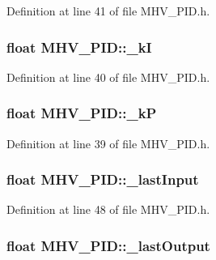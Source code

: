 \-Definition at line 41 of file \-M\-H\-V\-\_\-\-P\-I\-D.\-h.

\hypertarget{class_m_h_v___p_i_d_a47e47fe3d120325d9b12e205a274dcaa}{
\subsubsection[{\-\_\-k\-I}]{\setlength{\rightskip}{0pt plus 5cm}float {\bf \-M\-H\-V\-\_\-\-P\-I\-D\-::\-\_\-k\-I}}}
\label{class_m_h_v___p_i_d_a47e47fe3d120325d9b12e205a274dcaa}


\-Definition at line 40 of file \-M\-H\-V\-\_\-\-P\-I\-D.\-h.

\hypertarget{class_m_h_v___p_i_d_a2987b7582914a11ec39c38c2c2f8bb4f}{
\subsubsection[{\-\_\-k\-P}]{\setlength{\rightskip}{0pt plus 5cm}float {\bf \-M\-H\-V\-\_\-\-P\-I\-D\-::\-\_\-k\-P}}}
\label{class_m_h_v___p_i_d_a2987b7582914a11ec39c38c2c2f8bb4f}


\-Definition at line 39 of file \-M\-H\-V\-\_\-\-P\-I\-D.\-h.

\hypertarget{class_m_h_v___p_i_d_aa649c3528fb35b99ac6ce0dca338fcfb}{
\subsubsection[{\-\_\-last\-Input}]{\setlength{\rightskip}{0pt plus 5cm}float {\bf \-M\-H\-V\-\_\-\-P\-I\-D\-::\-\_\-last\-Input}}}
\label{class_m_h_v___p_i_d_aa649c3528fb35b99ac6ce0dca338fcfb}


\-Definition at line 48 of file \-M\-H\-V\-\_\-\-P\-I\-D.\-h.

\hypertarget{class_m_h_v___p_i_d_a8464b83c97658e1f78a0c927476af6de}{
\subsubsection[{\-\_\-last\-Output}]{\setlength{\rightskip}{0pt plus 5cm}float {\bf \-M\-H\-V\-\_\-\-P\-I\-D\-::\-\_\-last\-Output}}}
\label{class_m_h_v___p_i_d_a8464b83c97658e1f78a0c927476af6de}


